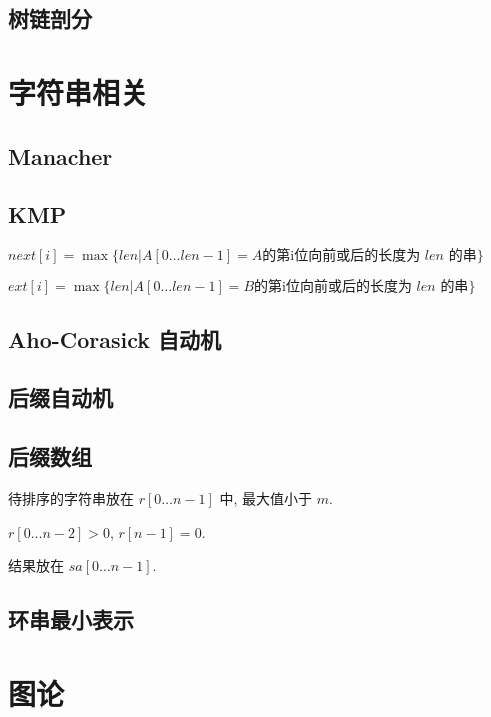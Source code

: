 \documentclass[landscape, twocolumn, 8pt, a4paper, twoside]{extarticle}
\begin{document}
  \subsection{树链剖分}
    

\section{字符串相关}
  \subsection{Manacher}
    

  \subsection{KMP}
    $next[i] = \max\{len | A[0 \ldots len - 1] = A \textrm{的第i位向前或后的长度为 $len$ 的串} \}$

    $ext[i] = \max\{len | A[0 \ldots len - 1] = B \textrm{的第i位向前或后的长度为 $len$ 的串} \}$
    

  \subsection{Aho-Corasick 自动机}
    

  \subsection{后缀自动机}
    

  \subsection{后缀数组}
    待排序的字符串放在 $r[0 \ldots n - 1]$ 中, 最大值小于 $m$.
    
    $r[0 \ldots n - 2] > 0$, $r[n - 1] = 0$.
    
    结果放在 $sa[0 \ldots n - 1]$.
    
  
  \subsection{环串最小表示}
    

\section{图论}
\end{document}
